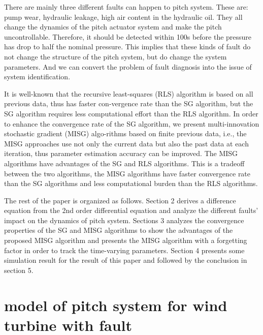 \documentclass[a4paper]{article}
\begin{document}
There are mainly three different faults can happen to pitch system. These are: pump wear, hydraulic leakage, high air content in the hydraulic oil. They all change the dynamics of the pitch actuator system and make the pitch uncontrollable. Therefore, it should be detected within 100s before the pressure has drop to half the nominal pressure. This implies that these kinds of fault do not change the structure of the pitch system, but do change the system parameters. And we can convert the problem of fault diagnosis into the issue of system identification.

It is well-known that the recursive least-squares (RLS) algorithm is based on all previous data, thus has faster con-vergence rate than the SG algorithm, but the SG algorithm
requires less computational effort than the RLS algorithm. In
order to enhance the convergence rate of the SG algorithm,
we present multi-innovation stochastic gradient (MISG) algo-rithms based on finite previous data, i.e., the MISG approaches
use not only the current data but also the past data at each
iteration, thus parameter estimation accuracy can be improved.
The MISG algorithms have advantages of the SG and RLS
algorithms. This is a tradeoff between the two algorithms, the MISG algorithms have faster convergence rate than the
SG algorithms and less computational burden than the RLS algorithms.

The rest of the paper is organized as follows. Section 2
derives a difference equation from the 2nd order differential equation and analyze the  different faults' impact on the dynamics of pitch system. Sections 3 analyzes the convergence properties of the SG and MISG algorithms to show
the advantages of the proposed MISG algorithm and presents the MISG algorithm with a forgetting factor in order to track the time-varying parameters. Section 4 presents some simulation result for the result of this paper and followed by the conclusion in section 5.

\section{model of pitch system for wind turbine with fault}

\subsection{}
\end{document}
